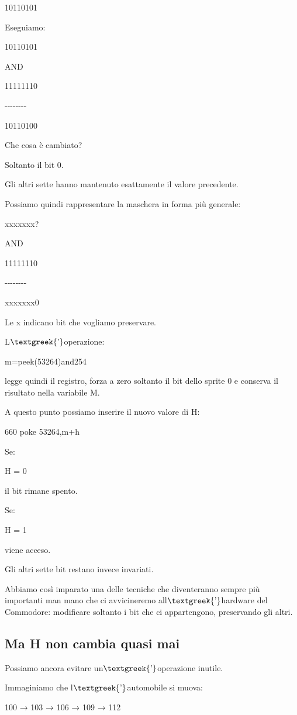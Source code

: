 \documentclass{article}
\begin{document}
10110101

Eseguiamo:

10110101

AND

11111110

{}-{}-{}-{}-{}-{}-{}-{}-

10110100

Che cosa è cambiato?

Soltanto il bit 0.

Gli altri sette hanno mantenuto esattamente il valore precedente.

Possiamo quindi rappresentare la maschera in forma più generale:

xxxxxxx?

AND

11111110

{}-{}-{}-{}-{}-{}-{}-{}-

xxxxxxx0

Le x indicano bit che vogliamo preservare.

L$\text{\textgreek{’}}$operazione:

m=peek(53264)and254

legge quindi il registro, forza a zero soltanto il bit dello sprite 0 e conserva il risultato nella variabile M.

A questo punto possiamo inserire il nuovo valore di H:

660 poke 53264,m+h

Se:

H = 0

il bit rimane spento.

Se:

H = 1

viene acceso.

Gli altri sette bit restano invece invariati.

Abbiamo così imparato una delle tecniche che diventeranno sempre più importanti man mano che ci avvicineremo
all$\text{\textgreek{’}}$hardware del Commodore: modificare soltanto i bit che ci appartengono, preservando gli altri.

\subsection{Ma H non cambia quasi mai}
Possiamo ancora evitare un$\text{\textgreek{’}}$operazione inutile.

Immaginiamo che l$\text{\textgreek{’}}$automobile si muova:

100 → 103 → 106 → 109 → 112
\end{document}
